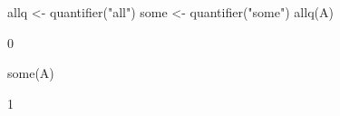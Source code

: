 \begin{Schunk}
% --begin: "quant6"
\begin{Sinput}
 allq <- quantifier("all")
 some <- quantifier("some")
 allq(A)
\end{Sinput}
\begin{Soutput}
[1] 0
\end{Soutput}
\begin{Sinput}
 some(A)
\end{Sinput}
\begin{Soutput}
[1] 1
\end{Soutput}
%
% --end: "quant6"
\end{Schunk}
